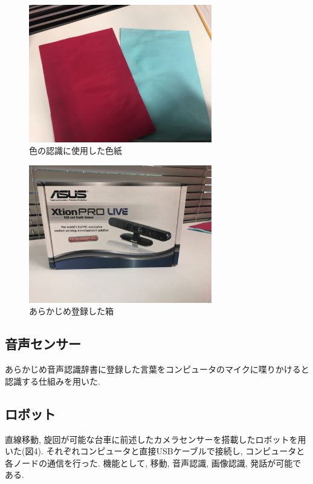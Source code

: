 \documentclass[a4paper,11pt,titlepage]{jsarticle}
\begin{document}
\begin{figure}[H]
  \begin{center}
    \includegraphics[width = 8cm]{画像/paper.jpg}
    \caption{色の認識に使用した色紙}
    \label{紙}
  \end{center}
\end{figure}

\begin{figure}[H]
  \begin{center}
    \includegraphics[width = 8cm]{画像/box.jpg}
    \caption{あらかじめ登録した箱}
    \label{箱}
  \end{center}
\end{figure}

\subsection{音声センサー}
あらかじめ音声認識辞書に登録した言葉をコンピュータのマイクに喋りかけると認識する仕組みを用いた.

\subsection{ロボット}
直線移動, 旋回が可能な台車に前述したカメラセンサーを搭載したロボットを用いた(図4). それぞれコンピュータと直接USBケーブルで接続し,
コンピュータと各ノードの通信を行った. 機能として, 移動, 音声認識, 画像認識, 発話が可能である.
\end{document}
